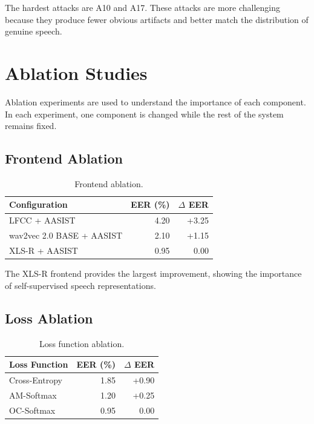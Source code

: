 \documentclass[sigconf]{acmart}
\begin{document}
The hardest attacks are A10 and A17. These attacks are more challenging because they produce fewer obvious artifacts and better match the distribution of genuine speech.

\section{Ablation Studies}

Ablation experiments are used to understand the importance of each component. In each experiment, one component is changed while the rest of the system remains fixed.

\subsection{Frontend Ablation}

\begin{table}[h]
\centering
\caption{Frontend ablation.}
\label{tab:frontend}
\begin{tabular}{lrr}
\toprule
Configuration & EER (\%) & $\Delta$ EER \\
\midrule
LFCC + AASIST & 4.20 & +3.25 \\
wav2vec 2.0 BASE + AASIST & 2.10 & +1.15 \\
XLS-R + AASIST & 0.95 & 0.00 \\
\bottomrule
\end{tabular}
\end{table}

The XLS-R frontend provides the largest improvement, showing the importance of self-supervised speech representations.

\subsection{Loss Ablation}

\begin{table}[h]
\centering
\caption{Loss function ablation.}
\label{tab:loss}
\begin{tabular}{lrr}
\toprule
Loss Function & EER (\%) & $\Delta$ EER \\
\midrule
Cross-Entropy & 1.85 & +0.90 \\
AM-Softmax & 1.20 & +0.25 \\
OC-Softmax & 0.95 & 0.00 \\
\bottomrule
\end{tabular}
\end{table}
\end{document}
